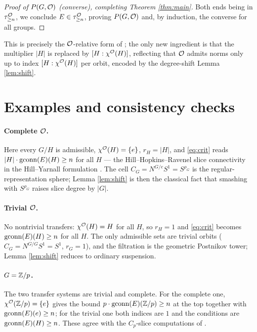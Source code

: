 \begin{proof}[Proof of $P(G,\mathcal{O})$ (converse), completing Theorem \ref{thm:main}]
Both ends being in $\tau^{\mathcal{O}}_{\ge n}$, we conclude $E\in\tau^{\mathcal{O}}_{\ge n}$, proving
$P(G,\mathcal{O})$ and, by induction, the converse for all groups.
\end{proof}

This is precisely the $\mathcal{O}$-relative form of \cite[Thm.~2.5]{HY18}; the only
new ingredient is that the multiplier $|H|$ is replaced by $[H:\chi^{\mathcal{O}}(H)]$,
reflecting that $\mathcal{O}$ admits norms only up to index $[H:\chi^{\mathcal{O}}(H)]$ per orbit,
encoded by the degree-shift Lemma \ref{lem:shift}.

\section*{Examples and consistency checks}

\paragraph{Complete $\mathcal{O}$.} Here every $G/H$ is admissible, $\chi^{\mathcal{O}}(H)=\{e\}$,
$r_H=|H|$, and \eqref{eq:crit} reads $|H|\cdot\operatorname{gconn}(E)(H)\ge n$ for all
$H$ --- the Hill--Hopkins--Ravenel slice connectivity in the Hill--Yarnall
formulation \cite{HY18, HHR16}. The cell $C_G=N^{G/e}S^1=S^{\rho_G}$ is the
regular-representation sphere; Lemma \ref{lem:shift} is then the classical fact
that smashing with $S^{\rho_G}$ raises slice degree by $|G|$.

\paragraph{Trivial $\mathcal{O}$.} No nontrivial transfers: $\chi^{\mathcal{O}}(H)=H$ for all $H$,
so $r_H=1$ and \eqref{eq:crit} becomes $\operatorname{gconn}(E)(H)\ge n$ for all
$H$. The only admissible sets are trivial orbits ($C_G=N^{G/G}S^1=S^1$,
$r_G=1$), and the filtration is the geometric Postnikov tower; Lemma
\ref{lem:shift} reduces to ordinary suspension.

\paragraph{$G=\mathbb{Z}/p$.} The two transfer systems are trivial and complete. For the
complete one, $\chi^{\mathcal{O}}(\mathbb{Z}/p)=\{e\}$ gives the bound $p\cdot\operatorname{gconn}(E)(\mathbb{Z}/p)\ge n$
at the top together with $\operatorname{gconn}(E)(e)\ge n$; for the trivial one both indices
are $1$ and the conditions are $\operatorname{gconn}(E)(H)\ge n$. These agree with the
$C_p$-slice computations of \cite{HY18}.

